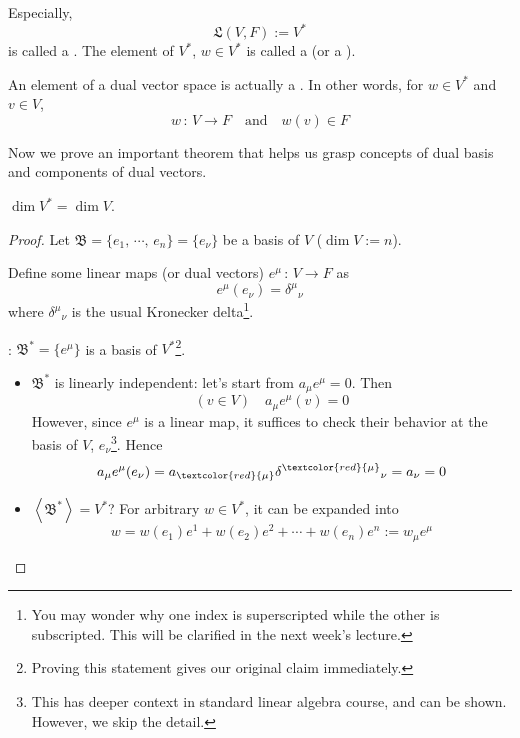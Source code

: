 \documentclass[a4paper, 10pt]{article}
\begin{document}
\begin{definition}
    Especially,
    \[ \mathfrak{L}(V, F) := V^{\ast} \]
    is called a . The element of $V^{\ast}$, $w \in V^{\ast}$ is called a  (or a ).
\end{definition}
\begin{remark}
    An element of a dual vector space is actually a . In other words, for $w \in V^{\ast}$ and $v \in V$,
    \[ w \,:\, V \rightarrow F \quad \text{and} \quad w(v) \in F \]
\end{remark}
Now we prove an important theorem that helps us grasp concepts of dual basis and components of dual vectors.
\begin{theorem}
    $\dim V^{\ast} = \dim V$.
\end{theorem}
\begin{proof}
    Let $\mathfrak{B} = \{e_{1} ,\, \cdots ,\, e_{n} \} = \{ e_{\nu} \}$ be a basis of $V$ ($\dim V := n$).

    Define some linear maps (or dual vectors) $e^{\mu} \,:\, V \rightarrow F$ as
    \[ e^{\mu}(e_{\nu}) = \delta^{\mu}{}_{\nu} \]
    where $\delta^{\mu}{}_{\nu}$ is the usual Kronecker delta\footnote{You may wonder why one index is superscripted while the other is subscripted. This will be clarified in the next week's lecture.}.

    : $\mathfrak{B}^{\ast} = \{ e^{\mu} \}$ is a basis of $V^{\ast}$\footnote{Proving this statement gives our original claim immediately.}.
    \begin{itemize}
        \item[(1)] $\mathfrak{B}^{\ast}$ is linearly independent: let's start from $a_{\mu}e^{\mu} = 0$. Then
        \[ (v \in V) \quad a_{\mu} e^{\mu}(v) = 0 \]
        However, since $e^{\mu}$ is a linear map, it suffices to check their behavior at the basis of $V$, $e_{\nu}$\footnote{This has deeper context in standard linear algebra course, and can be shown. However, we skip the detail.}. Hence
        \[ a_{\mu} e^{\mu}(e_{\nu}) = a_{\textcolor{red}{\mu}}\delta^{\textcolor{red}{\mu}}{}_{\nu} = a_{\nu} = 0 \]
        \item[(2)] $\left<\mathfrak{B}^{\ast}\right> = V^{\ast}$? For arbitrary $w \in V^{\ast}$, it can be expanded into
        \[ w = w(e_{1})e^{1} + w(e_{2})e^{2} + \cdots + w(e_{n})e^{n} := w_{\mu}e^{\mu} \]
    \end{itemize}
\end{proof}
\newpage
\end{document}
